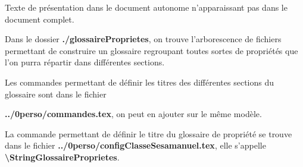 \documentclass[nocrop]{\persopath/sesamanuel}
\begin{document}
Texte de présentation dans le document autonome n'apparaissant pas dans le document complet.

\medskip

Dans le dossier \textbf{./glossaireProprietes}, on trouve l'arborescence de fichiers permettant de construire un glossaire
regroupant toutes sortes de propriétés que l'on purra répartir dans différentes sections.

\medskip

Les commandes permettant de définir les titres des différentes sections du glossaire sont 
dans le fichier \par \textbf{../0perso/commandes.tex}, on peut en ajouter sur le même modèle.

\medskip

La commande permettant de définir le titre du glossaire de propriété se trouve dans le fichier
\textbf{../0perso/configClasseSesamanuel.tex}, elle s'appelle \textbf{\textbackslash StringGlossaireProprietes}.


\end{document}
